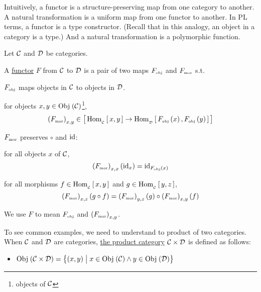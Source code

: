 \begin{enumcirc}
	\item
	Intuitively, a functor is a structure-preserving map from one category to
	another.
	A natural transformation is a uniform map from one functor to another.
	In PL terms, a functor is a type constructor.
	(Recall that in this analogy, an object in a category is a type.)
	And a natural transformation is a polymorphic function.
	\item
	Let $\Cc$ and $\Dc$ be categories.
	\begin{definition}
		A \ul{functor} $F$ from $\Cc$ to $\Dc$ is a pair of two maps
		$\subsctext{F}{obj}$ and $\subsctext{F}{mor}$ s.t.
		\begin{enumrm}
			\item
			$\subsctext{F}{obj}$ maps objects in $\Cc$ to objects in $\Dc$.
			\item
			for objects $x, y \in \Obj\prths{\Cc}$\footnote{objects of $\Cc$},
			\[
				\prths{\subsctext{F}{mor}}_{x,y} \in
				\brackets{
					\Homset[\Cc]{x}{y} \to
					\Homset[\Dc]{\subsctext{F}{obj}\prths{x}}{\subsctext{F}{obj}\prths{y}}}
			\]
			\item
			$\subsctext{F}{mor}$ preserves $\circ$ and $\id$:
			\begin{enumalpha}
				\item
				for all objects $x$ of $\Cc$,
				\[
					\prths{\subsctext{F}{mor}}_{x,x}\prths{\id_x} = \id_{\subsctext{F}{obj}\prths{x}}
				\]
				\item
				for all morphisms $f \in \Homset[\Cc]{x}{y}$ and $g \in \Homset[\Cc]{y}{z}$,
				\[
					\prths{\subsctext{F}{mor}}_{x,z}\prths{g \circ f} =
					\prths{\subsctext{F}{mor}}_{y,z}\prths{g} \circ
					\prths{\subsctext{F}{mor}}_{x,y}\prths{f}
				\]
			\end{enumalpha}
		\end{enumrm}
	\end{definition}
	We use $F$ to mean $\subsctext{F}{obj}$ and $\prths{\subsctext{F}{mor}}_{x,y}$.
	\item
	To see common examples, we need to understand to product of two categories.
	When $\Cc$ and $\Dc$ are categories, \ul{the product category} $\Cc \times \Dc$
	is defined as follows:
	\begin{itemize}
		\item
		      $\Obj\prths{\Cc \times \Dc} = \set{\prths{x, y}}{x \in \Obj\prths{\Cc} \wedge y \in \Obj\prths{\Dc}}$

\end{itemize}
\end{enumcirc}
